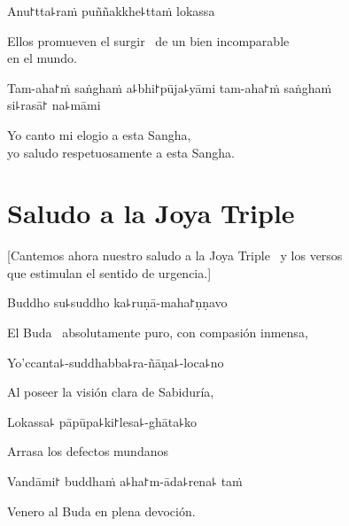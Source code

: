 Anu꜓tta꜕raṁ puññakkhe꜕ttaṁ lokassa

\begin{english}
  Ellos promueven el surgir \pause\ de un bien incomparable\\ en el mundo.
\end{english}

Tam-aha꜓ṁ saṅghaṁ a꜕bhi꜓pūja꜕yāmi tam-aha꜓ṁ saṅghaṁ\\ si꜕rasā꜓ na꜕māmi

\begin{english}
  Yo canto mi elogio a esta Sangha,\\
  yo saludo respetuosamente a esta Sangha.
\end{english}

\clearpage

\chapter{Saludo a la Joya Triple}

\begin{leader}
\end{leader}

\begin{english}
  [Cantemos ahora nuestro saludo a la Joya Triple \pause\ y los versos\\ que estimulan el sentido de urgencia.]
\end{english}

Buddho su꜕suddho ka꜕ruṇā-maha꜓ṇṇavo

\begin{english}
  El Buda \pause\ absolutamente puro, con compasión inmensa,
\end{english}

Yo'ccanta꜕-suddhabba꜕ra-ñāṇa꜕-loca꜕no

\begin{english}
 Al poseer la visión clara de Sabiduría,
\end{english}

Lokassa꜕ pāpūpa꜕ki꜓lesa꜕-ghāta꜕ko

\begin{english}
  Arrasa los defectos mundanos 
\end{english}

Vandāmi꜓ buddhaṁ a꜕ha꜓m-āda꜕rena꜕ taṁ

\begin{english}
  Venero al Buda en plena devoción.
\end{english}

